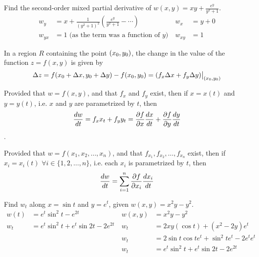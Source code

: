 \begin{example}
    \normalfont Find the second-order mixed partial derivative of $w(x, y) = xy + \frac{e^y}{y^2 + 1}$.
    \begin{align*}
        w_y &= x + \frac{1}{(y^2 + 1)^2} \left( \frac{e^y}{y^2 + 1} - \cdots \right) &\ w_x &= y + 0 \\
        w_{yx} &= 1 \text{ (as the term was a function of } y \text{)} &\ w_{xy} &= 1
    \end{align*}
\end{example}

\begin{theorem}
    In a region $R$ containing the point $(x_0, y_0)$, the change in the value of the function $z = f(x, y)$ is given by
    \begin{equation}
        \Delta z = f(x_0 + \Delta x, y_0 + \Delta y) - f(x_0, y_0) = (f_x \Delta x + f_y \Delta y) \big |_{(x_0, y_0)}
    \end{equation}
\end{theorem}

\begin{theorem}
    Provided that $w = f(x, y)$, and that $f_x$ and $f_y$ exist, then if $x = x(t)$ and $y = y(t)$, i.e. $x$ and $y$ are
    parametrized by $t$, then
    \begin{equation}
        \frac{dw}{dt} = f_x x_t + f_y y_t = \frac{\partial f}{\partial x} \frac{dx}{dt} + \frac{\partial f}{\partial y} \frac{dy}{dt}
    \end{equation}.
\end{theorem}

\begin{theorem}
    Provided that $w = f(x_1, x_2, \hdots, x_n)$, and that $f_{x_1}, f_{x_2}, \hdots, f_{x_n}$ exist, then if $x_i = x_i(t)$
    $\forall i \in \{1, 2, \hdots, n \}$, i.e. each $x_i$ is parametrized by $t$, then
    \begin{equation}
        \frac{dw}{dt} = \sum_{i=1}^n \frac{\partial f}{\partial x_i} \frac{dx_i}{dt}
    \end{equation}
\end{theorem}

\begin{example}
    \normalfont Find $w_t$ along $x = \sin{t}$ and $y = e^t$, given $w(x, y) = x^2y - y^2$.
    \begin{align*}
        w(t) &= e^t\sin^2{t} - e^{2t} &\ w(x, y) &= x^2y - y^2 \\
        w_t &= e^t\sin^2{t} + e^t\sin{2t} - 2e^{2t} &\ w_t &= 2xy(\cos{t}) + (x^2 - 2y)e^t \\
        &\ &\ w_t &= 2\sin{t}\cos{t} e^t + \sin^2{t} e^t - 2e^te^t \\
        &\ &\ w_t &= e^t\sin^2{t} + e^t\sin{2t} - 2e^{2t}
    \end{align*}
\end{example}


